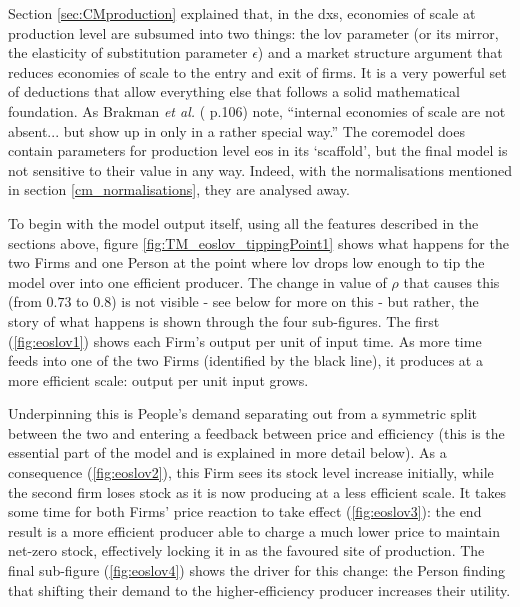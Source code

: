 Section \ref{sec:CMproduction} explained that, in the \gls{dxs}, economies of scale at production level are subsumed into two things: the \gls{lov} parameter (or its mirror, the elasticity of substitution parameter $\epsilon$) and a market structure argument that reduces economies of scale to the entry and exit of firms. It is a very powerful set of deductions that allow everything else that follows a solid mathematical foundation. As Brakman \emph{et al.} (\citeyear{brakman_new_2009} p.106) note, ``internal economies of scale are not absent... but show up in only in a rather special way.'' The \gls{coremodel} does contain parameters for production level \gls{eos} in its `scaffold', but the final model is not sensitive to their value in any way. Indeed, with the normalisations mentioned in section \ref{cm_normalisations}, they are analysed away. 

To begin with the model output itself, using all the features described in the sections above, figure \ref{fig:TM_eoslov_tippingPoint1} shows what happens for the two Firms and one Person at the point where \gls{lov} drops low enough to tip the model over into one efficient producer. The change in value of $\rho$ that causes this (from $0.73$ to $0.8$) is not visible - see below for more on this - but rather, the story of what happens is shown through the four sub-figures. The first (\ref{fig:eoslov1}) shows each Firm's output per unit of input time. As more time feeds into one of the two Firms (identified by the black line), it produces at a more efficient scale: output per unit input grows. 

Underpinning this is People's demand separating out from a symmetric split between the two and entering a feedback between price and efficiency (this is the essential part of the model and is explained in more detail below). As a consequence (\ref{fig:eoslov2}), this Firm sees its stock level increase initially, while the second firm loses stock as it is now producing at a less efficient scale. It takes some time for both Firms' price reaction to take effect (\ref{fig:eoslov3}): the end result is a more efficient producer able to charge a much lower price to maintain net-zero stock, effectively locking it in as the favoured site of production. The final sub-figure (\ref{fig:eoslov4}) shows the driver for this change: the Person finding that shifting their demand to the higher-efficiency producer increases their utility. 

